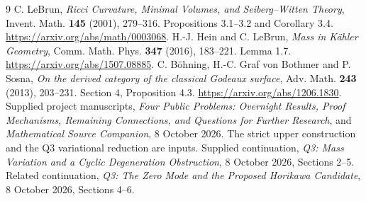 \documentclass[11pt,a4paper]{article}
\theoremstyle{definition}
\theoremstyle{remark}
\begin{document}
\begin{thebibliography}{9}
 C. LeBrun, \emph{Ricci Curvature, Minimal Volumes, and
Seiberg--Witten Theory}, Invent. Math. \textbf{145} (2001), 279--316.
Propositions 3.1--3.2 and Corollary 3.4.
\url{https://arxiv.org/abs/math/0003068}.
 H.-J. Hein and C. LeBrun, \emph{Mass in K\"ahler Geometry},
Comm. Math. Phys. \textbf{347} (2016), 183--221. Lemma 1.7.
\url{https://arxiv.org/abs/1507.08885}.
 C. B\"ohning, H.-C. Graf von Bothmer and P. Sosna,
\emph{On the derived category of the classical Godeaux surface},
Adv. Math. \textbf{243} (2013), 203--231. Section 4, Proposition 4.3.
\url{https://arxiv.org/abs/1206.1830}.
 Supplied project manuscripts,
\emph{Four Public Problems: Overnight Results, Proof Mechanisms,
Remaining Connections, and Questions for Further Research}, and
\emph{Mathematical Source Companion}, 8 October 2026.
The strict upper construction and the Q3 variational reduction are inputs.
 Supplied continuation,
\emph{Q3: Mass Variation and a Cyclic Degeneration Obstruction},
8 October 2026, Sections 2--5.
 Related continuation,
\emph{Q3: The Zero Mode and the Proposed Horikawa Candidate},
8 October 2026, Sections 4--6.
\end{thebibliography}
\end{document}
